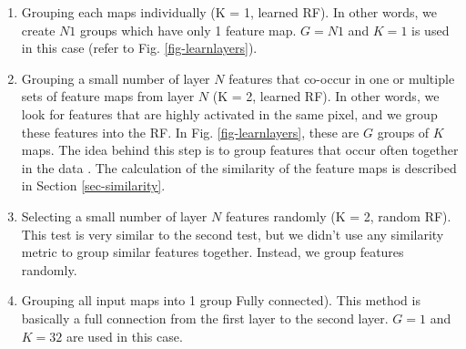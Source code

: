 \documentclass{article} %
\begin{document}
\begin{enumerate}

\item Grouping each maps individually (K = 1, learned RF). In other words, we create $N1$ groups which have only 1 feature map. 
$G = N1$ and $K = 1$ is used in this case (refer to Fig. \ref{fig-learnlayers}).

\item Grouping a small number of layer $N$ features that co-occur in one or multiple sets of feature maps from layer $N$ (K = 2, learned RF). 
In other words, we look for features that are highly activated in the same pixel, and we group these features into the RF.
In Fig. \ref{fig-learnlayers}, these are $G$ groups of $K$ maps.
The idea behind this step is to group features that occur often together in the data \cite{masquelier2007learning}.
The calculation of the similarity of the feature maps is described in Section \ref{sec-similarity}.

\item Selecting a small number of layer $N$ features randomly (K = 2, random RF).
This test is very similar to the second test, but we didn't use any similarity metric to group similar features together.
Instead, we group features randomly.

\item Grouping all input maps into 1 group Fully connected).
This method is basically a full connection from the first layer to the second layer. 
$G = 1$ and $K = 32$ are used in this case.

\end{enumerate}
\end{document}
